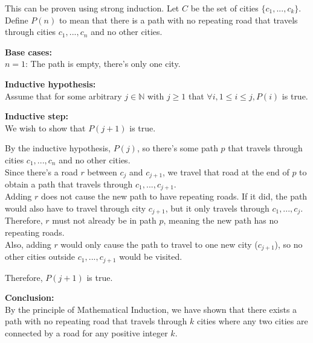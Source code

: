 \documentclass[leqno]{article}
\numberwithin{equation}{section}
\theoremstyle{definition}
\begin{document}
This can be proven using strong induction. Let $C$ be the set of cities $\{c_1, ..., c_k\}$. Define $P(n)$ to mean that there is a path with no repeating road that travels through cities $c_1, ..., c_n$ and no other cities.

\textbf{Base cases:}\\
$n = 1$: The path is empty, there's only one city.

\textbf{Inductive hypothesis:}\\
Assume that for some arbitrary $j \in \mathbb{N}$ with $j \geq 1$ that $\forall i, 1 \leq i \leq j, P(i)$ is true.

\textbf{Inductive step:}\\
We wish to show that $P(j+1)$ is true.

By the inductive hypothesis, $P(j)$, so there's some path $p$ that travels through cities $c_1, ..., c_n$ and no other cities.\\
Since there's a road $r$ between $c_j$ and $c_{j+1}$, we travel that road at the end of $p$ to obtain a path that travels through $c_1, ..., c_{j+1}$.\\
Adding $r$ does not cause the new path to have repeating roads. If it did, the path would also have to travel through city $c_{j+1}$, but it only travels through $c_1, ..., c_j$. Therefore, $r$ must not already be in path $p$, meaning the new path has no repeating roads.\\
Also, adding $r$ would only cause the path to travel to one new city ($c_{j+1}$), so no other cities outside $c_1, ..., c_{j+1}$ would be visited.

Therefore, $P(j + 1)$ is true.

\textbf{Conclusion:}\\
By the principle of Mathematical Induction, we have shown that there exists a path with no repeating road that travels through $k$ cities where any two cities are connected by a road for any positive integer $k$.
\end{document}
